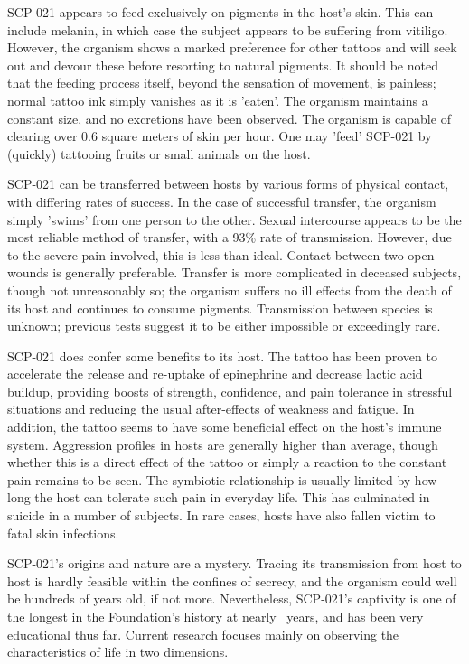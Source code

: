 SCP-021 appears to feed exclusively on pigments in the host's skin. This can include melanin, in which case the subject appears to be suffering from vitiligo. However, the organism shows a marked preference for other tattoos and will seek out and devour these before resorting to natural pigments. It should be noted that the feeding process itself, beyond the sensation of movement, is painless; normal tattoo ink simply vanishes as it is 'eaten'. The organism maintains a constant size, and no excretions have been observed. The organism is capable of clearing over 0.6 square meters of skin per hour. One may 'feed' SCP-021 by (quickly) tattooing fruits or small animals on the host.

SCP-021 can be transferred between hosts by various forms of physical contact, with differing rates of success. In the case of successful transfer, the organism simply 'swims' from one person to the other. Sexual intercourse appears to be the most reliable method of transfer, with a 93\% rate of transmission. However, due to the severe pain involved, this is less than ideal. Contact between two open wounds is generally preferable. Transfer is more complicated in deceased subjects, though not unreasonably so; the organism suffers no ill effects from the death of its host and continues to consume pigments. Transmission between species is unknown; previous tests suggest it to be either impossible or exceedingly rare.

SCP-021 does confer some benefits to its host. The tattoo has been proven to accelerate the release and re-uptake of epinephrine and decrease lactic acid buildup, providing boosts of strength, confidence, and pain tolerance in stressful situations and reducing the usual after-effects of weakness and fatigue. In addition, the tattoo seems to have some beneficial effect on the host's immune system. Aggression profiles in hosts are generally higher than average, though whether this is a direct effect of the tattoo or simply a reaction to the constant pain remains to be seen.
\newpage
The symbiotic relationship is usually limited by how long the host can tolerate such pain in everyday life. This has culminated in suicide in a number of subjects. In rare cases, hosts have also fallen victim to fatal skin infections.

SCP-021's origins and nature are a mystery. Tracing its transmission from host to host is hardly feasible within the confines of secrecy, and the organism could well be hundreds of years old, if not more. Nevertheless, SCP-021's captivity is one of the longest in the Foundation's history at nearly \expunged \ years, and has been very educational thus far. Current research focuses mainly on observing the characteristics of life in two dimensions.